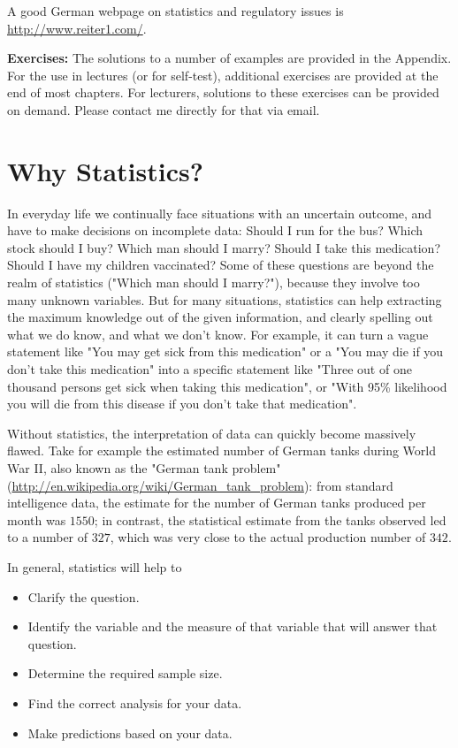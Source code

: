  A good German webpage on statistics and regulatory issues is \url{http://www.reiter1.com/}.

\vspace{5 mm}

\textbf{Exercises: }The solutions to a number of examples are provided in the Appendix. For the use in lectures (or for self-test), additional exercises are provided at the end of most chapters. For lecturers, solutions to these exercises can be provided on demand. Please contact me directly for that via email.

\section{Why Statistics?}

In everyday life we continually face situations with an uncertain outcome, and have to make decisions on incomplete data: Should I run for the bus? Which stock should I buy? Which man should I marry? Should I take this medication? Should I have my children vaccinated? Some of these questions are beyond the realm of statistics ("Which man should I marry?"), because they involve too many unknown variables. But for many situations, statistics can help extracting the maximum knowledge out of the given information, and clearly spelling out what we do know, and what we don't know. For example, it can turn a vague statement like "You may get sick from this medication" or a  "You may die if you don't take this medication" into a specific statement like "Three out of one thousand persons get sick when taking this medication", or "With 95\% likelihood you will die from this disease if you don't take that medication".

Without statistics, the interpretation of data can quickly become massively flawed. Take for example the estimated number of German tanks during World War II, also known as the "German tank problem" (\url{http://en.wikipedia.org/wiki/German_tank_problem}): from standard intelligence data, the estimate for the number of German tanks produced per month was $1550$; in contrast, the statistical estimate from the tanks observed led to a number of $327$, which was very close to the actual production number of $342$.

In general, statistics will help to
\begin{itemize}
  \item Clarify the question.
  \item Identify the variable and the measure of that variable that will answer that question.
  \item Determine the required sample size.
  \item Find the correct analysis for your data.
  \item Make predictions based on your data.
\end{itemize}

